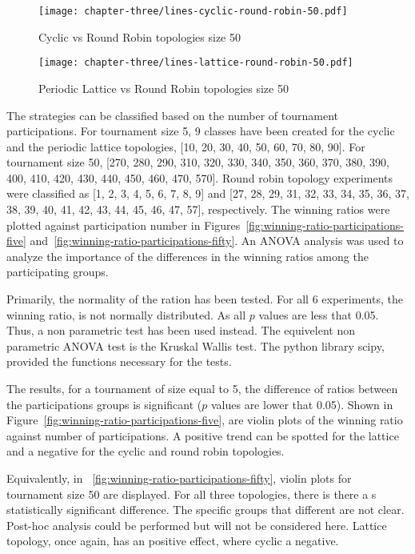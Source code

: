 \begin{figure}[H]
	\centering
	\texttt{[image: chapter-three/lines-cyclic-round-robin-50.pdf]}
	\caption{Cyclic vs Round Robin topologies size 50}
	\label{fig:winning-rankings-fifty-c-r}
\end{figure}

\begin{figure}[H]
	\centering
	\texttt{[image: chapter-three/lines-lattice-round-robin-50.pdf]}
	\caption{Periodic Lattice vs Round Robin topologies size 50}
	\label{fig:winning-rankings-fifty-l-r}
\end{figure}

The strategies can be classified based on the number of tournament
participations. For tournament size 5, 9 classes have been created for
the cyclic and the periodic lattice topologies, [10, 20, 30, 40, 50, 60, 70, 80, 90].
For tournament
size 50, [270, 280, 290, 310, 320, 330, 340, 350, 360, 370, 380, 390, 400, 410,
420, 430, 440, 450, 460, 470, 570]. Round robin topology
experiments were classified as [1, 2, 3, 4, 5, 6, 7, 8, 9] and
[27, 28, 29, 31, 32, 33, 34, 35, 36, 37, 38, 39, 40, 41, 42, 43, 44, 45, 46, 47, 57],
respectively. The winning ratios were plotted against participation number
in Figures~\ref{fig:winning-ratio-participations-five} and~\ref{fig:winning-ratio-participations-fifty}.
An ANOVA analysis was used to analyze the importance of the
differences in the winning ratios among the participating groups.

Primarily, the normality of the ration has been tested. For all 6 experiments,
the winning ratio, is not normally distributed. As all \(p\) values are
less that 0.05. Thus, a non parametric test has been used instead. The equivelent
non parametric ANOVA test is the Kruskal Wallis test. The python library
scipy, provided the functions necessary for the tests.

The results, for a tournament of size equal to 5, the difference
of ratios between the participations groups is significant (\(p\) values
are lower that 0.05). Shown in Figure~\ref{fig:winning-ratio-participations-five},
are violin plots of the winning ratio against number of participations.
A positive trend can be spotted for the lattice and a negative for the cyclic
and round robin topologies.

Equivalently, in ~\ref{fig:winning-ratio-participations-fifty}, violin plots for
tournament size 50 are displayed. For all three topologies, there is there  a s
statistically significant difference. The specific groups that different are not
clear. Post-hoc analysis could be performed but will not be considered here.
Lattice topology, once again, has an positive effect, where cyclic a negative.

